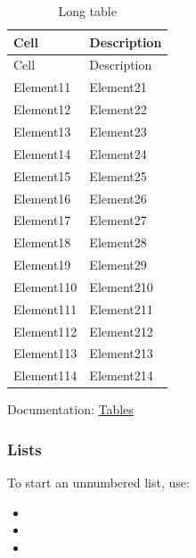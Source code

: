 \begin{longtable}[c]{| m{4.4cm} | m{11cm} |}
\caption{Long table}\\
 \hline

 Cell & Description  \\ 
 \hline
 \endfirsthead

 \hline
 
 Cell & Description  \\ 
 \hline
 \endhead

        \hline
          Element11 & Element21 \\
        \hline
          Element12 & Element22 \\
        \hline
          Element13 & Element23 \\
        \hline
          Element14 & Element24 \\
        \hline
          Element15 & Element25 \\
        \hline
          Element16 & Element26 \\
        \hline
          Element17 & Element27 \\
        \hline
          Element18 & Element28 \\
        \hline
          Element19 & Element29 \\
        \hline
          Element110 & Element210 \\
        \hline
          Element111 & Element211 \\
        \hline
          Element112 & Element212 \\
        \hline
          Element113 & Element213 \\
        \hline
          Element114 & Element214 \\
        \hline

 \end{longtable}


Documentation: \href{https://www.overleaf.com/learn/latex/Tables}{Tables}


\subsubsection{Lists}

To start an unnumbered list, use:

\begin{itemize}
    \item 
    \item 
    \item 
\end{itemize}

